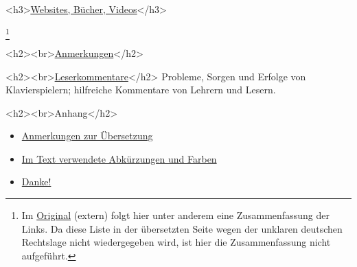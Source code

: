 <h3>\underline{\hyperref[Websites]{Websites, Bücher, Videos}}</h3>

\footnote{Im \hyperref[http://www.pianopractice.org]{Original} (extern) folgt hier unter anderem eine Zusammenfassung der Links.
Da diese Liste in der übersetzten Seite wegen der unklaren deutschen Rechtslage nicht wiedergegeben wird, ist hier die Zusammenfassung nicht aufgeführt.}


<h2><br>\hyperref[anmerkungen]{Anmerkungen}</h2>

<h2><br>\hyperref[testimonials]{Leserkommentare}</h2>
Probleme, Sorgen und Erfolge von Klavierspielern; hilfreiche Kommentare von Lehrern und Lesern.


<h2><br>Anhang</h2>

\begin{itemize} 
 \item \hyperref[ueberset]{Anmerkungen zur Übersetzung}
 \item \hyperref[AbkFarben]{Im Text verwendete Abkürzungen und Farben}
 \item \hyperref[Danke]{Danke!}
 \end{itemize}




